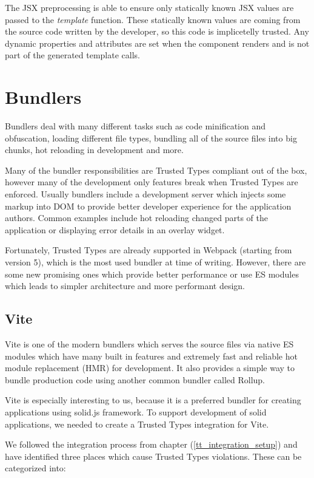 The JSX preprocessing is able to ensure only statically known JSX values are passed to the
\textit{template} function. These statically known values are coming from the source code written by
the developer, so this code is implicetelly trusted. Any dynamic properties and attributes are set
when the component renders and is not part of the generated template calls.

\section{Bundlers}

Bundlers deal with many different tasks such as code minification and obfuscation, loading different
file types, bundling all of the source files into big chunks, hot reloading in development and more.

Many of the bundler responsibilities are Trusted Types compliant out of the box, however many of the
development only features break when Trusted Types are enforced. Usually bundlers include a
development server which injects some markup into DOM to provide better developer experience for the
application authors. Common examples include hot reloading changed parts of the application or
displaying error details in an overlay widget.

Fortunately, Trusted Types are already supported in Webpack (starting from version 5), which is the
most used bundler at time of writing. However, there are some new promising ones which provide
better performance or use ES modules which leads to simpler architecture and more performant design.

\subsection{Vite}

Vite is one of the modern bundlers which serves the source files via native ES modules which have
many built in features and extremely fast and reliable hot module replacement (HMR) for development.
It also provides a simple way to bundle production code using another common bundler called Rollup.

Vite is especially interesting to us, because it is a preferred bundler for creating applications
using solid.js framework. To support development of solid applications, we needed to create a
Trusted Types integration for Vite.

We followed the integration process from chapter (\ref{tt_integration_setup}) and have identified
three places which cause Trusted Types violations. These can be categorized into:

